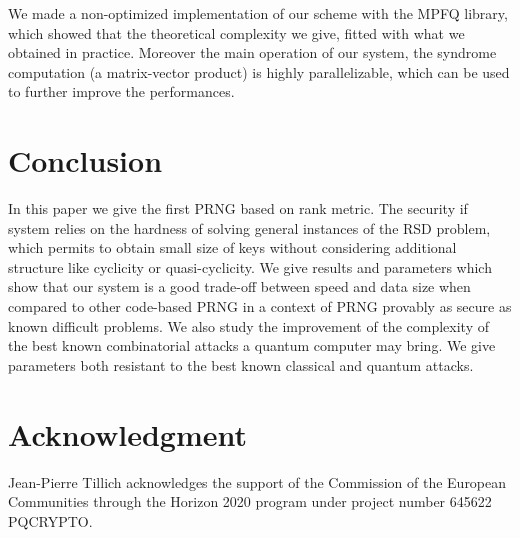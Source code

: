 \documentclass[11pt, a4paper]{llncs}
\begin{document}
We made a non-optimized implementation of our scheme with the MPFQ library, which showed that the
theoretical complexity we give, fitted with what we obtained in practice. Moreover the main operation
of our system, the syndrome computation (a matrix-vector product) is highly parallelizable, which can be used to further improve the performances.

 








%
 
\section{Conclusion}

In this paper we give the first PRNG based on rank metric. The security if system relies
on the hardness of solving general instances of the RSD problem, which permits to obtain small size
of keys without considering additional structure like cyclicity or quasi-cyclicity. We give results and parameters
which show that our system is a good trade-off between speed and data size when compared to
other code-based PRNG in a context of PRNG provably as secure as known difficult problems. 
We also study the improvement of the complexity of the best known combinatorial attacks a quantum computer 
may bring. We give parameters both resistant to the best known classical and quantum attacks.

\section*{Acknowledgment}
Jean-Pierre Tillich acknowledges the support of the Commission of the European Communities 
through the Horizon 2020 program under project number 645622 PQCRYPTO.
\end{document}
